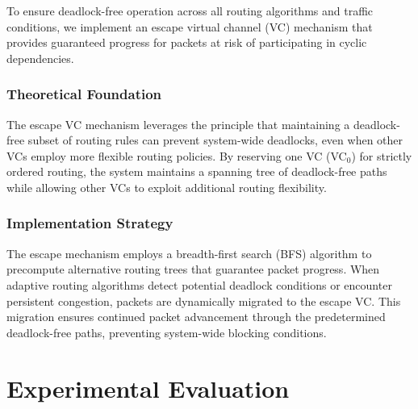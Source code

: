 \documentclass[11pt]{article}
\begin{document}
To ensure deadlock-free operation across all routing algorithms and traffic conditions, we implement an escape virtual channel (VC) mechanism that provides guaranteed progress for packets at risk of participating in cyclic dependencies.

\subsubsection{Theoretical Foundation}
The escape VC mechanism leverages the principle that maintaining a deadlock-free subset of routing rules can prevent system-wide deadlocks, even when other VCs employ more flexible routing policies. By reserving one VC (VC$_0$) for strictly ordered routing, the system maintains a spanning tree of deadlock-free paths while allowing other VCs to exploit additional routing flexibility.

\subsubsection{Implementation Strategy}
The escape mechanism employs a breadth-first search (BFS) algorithm to precompute alternative routing trees that guarantee packet progress. When adaptive routing algorithms detect potential deadlock conditions or encounter persistent congestion, packets are dynamically migrated to the escape VC. This migration ensures continued packet advancement through the predetermined deadlock-free paths, preventing system-wide blocking conditions.
\section{Experimental Evaluation}
\end{document}
